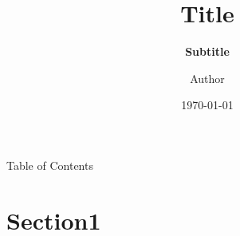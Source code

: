 \documentclass[9pt,aspectratio=43,mathserif,table]{beamer}
\title{\fontsize{14pt}{14pt} Title}
\subtitle{\fontsize{11pt}{14pt}\textbf{Subtitle}}
\author{\fontsize{8pt}{14pt}Author}  %
\institute{\fontsize{8pt}{14pt} Computer Science Institute}
\date{\today}
\begin{document}

\frame{\titlepage}

\section[Table of Contents]{}   %
\begin{frame}{Table of Contents}\small
  \begin{spacing}{0.5}
    \tableofcontents
  \end{spacing}
\end{frame}

\section{Section1}  %
\end{document}
